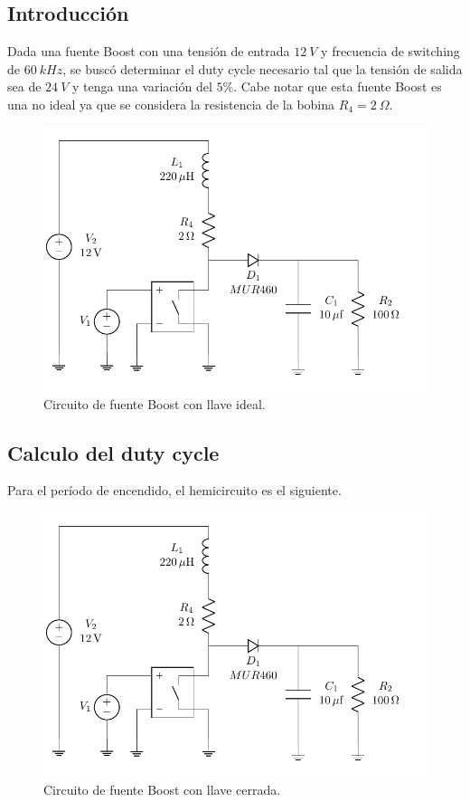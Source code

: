 



\subsection{Introducción}

Dada una fuente Boost con una tensión de entrada $12 \ V$ y frecuencia de switching de $60 \ kHz$, se buscó determinar el duty cycle necesario tal que la tensión de salida sea de $24 \ V$ y tenga una variación del $5\%$. Cabe notar que esta fuente Boost es una no ideal ya que se considera la resistencia de la bobina $R_4 = 2 \ \Omega$.

\begin{figure}[H]
	\centering
	\includegraphics[width=0.5\linewidth, page=1]{ImagenesEjercicio-2/CircuitsEj2}
	\caption{Circuito de fuente Boost con llave ideal.}
	\label{fig:ej2:circuito}
\end{figure}

\subsection{Calculo del duty cycle}

Para el período de encendido, el hemicircuito es el siguiente. 

\begin{figure}[H]
	\centering
	\includegraphics[width=0.6\linewidth, page=2]{ImagenesEjercicio-2/CircuitsEj2}
	\caption{Circuito de fuente Boost con llave cerrada.}
	\label{fig:ej2:circuito_off}
\end{figure}

